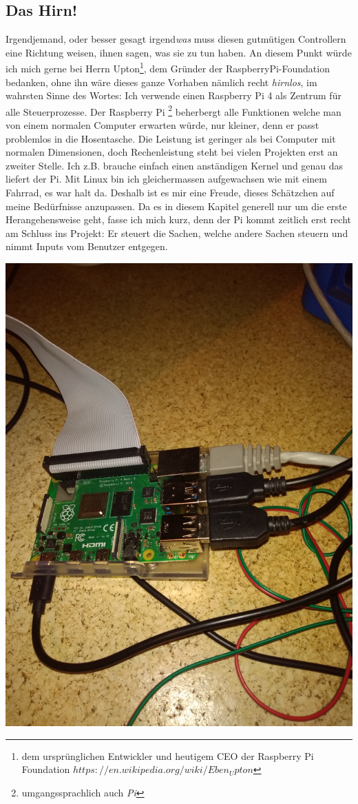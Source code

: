\documentclass[12pt,titlepage,a4paper]{article}
\begin{document}
\subsection{Das Hirn!}
Irgendjemand, oder besser gesagt irgend\textit{was} muss diesen gutmütigen Controllern eine Richtung weisen, ihnen sagen, was sie zu tun haben. An diesem Punkt würde ich mich gerne bei Herrn Upton\footnote{dem ursprünglichen Entwickler und heutigem CEO der Raspberry Pi Foundation $https://en.wikipedia.org/wiki/Eben_Upton$}, dem Gründer der RaspberryPi-Foundation bedanken, ohne ihn wäre dieses ganze Vorhaben nämlich recht \textit{hirnlos}, im wahrsten Sinne des Wortes: Ich verwende einen Raspberry Pi 4 als Zentrum für alle Steuerprozesse. Der Raspberry Pi \footnote{umgangssprachlich auch \textit{Pi}} beherbergt alle Funktionen welche man von einem normalen Computer erwarten würde, nur kleiner, denn er passt problemlos in die Hosentasche. Die Leistung ist geringer als bei Computer mit normalen Dimensionen, doch Rechenleistung steht bei vielen Projekten erst an zweiter Stelle. Ich z.B. brauche einfach einen anständigen Kernel und genau das liefert der Pi. Mit Linux bin ich gleichermassen aufgewachsen wie mit einem Fahrrad, es war halt da. Deshalb ist es mir eine Freude, dieses Schätzchen auf meine Bedürfnisse anzupassen. Da es in diesem Kapitel generell nur um die erste Herangehensweise geht, fasse ich mich kurz, denn der Pi kommt zeitlich erst recht am Schluss ins Projekt: Er steuert die Sachen, welche andere Sachen steuern und nimmt Inputs vom Benutzer entgegen.

\includegraphics[scale=0.05, angle=180]{raspi}
\end{document}
